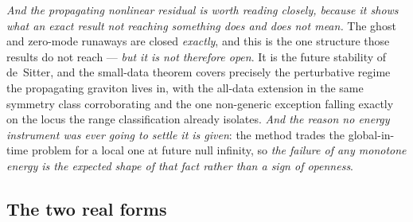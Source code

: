 \documentclass[11pt,a4paper]{article}
\theoremstyle{plain}
\theoremstyle{definition}
\begin{document}
\emph{And the propagating nonlinear residual is worth reading closely, because it shows what an exact result
not reaching something does and does not mean.} The ghost and zero-mode runaways are closed \emph{exactly},
and this is the one structure those results do not reach --- \emph{but it is not therefore open}. It is the
future stability of de~Sitter, and the small-data theorem covers precisely the perturbative regime the
propagating graviton lives in, with the all-data extension in the same symmetry class corroborating and the
one non-generic exception falling exactly on the locus the range classification already isolates. \emph{And
the reason no energy instrument was ever going to settle it is given}: the method trades the global-in-time
problem for a local one at future null infinity, so \emph{the failure of any monotone energy is the expected
shape of that fact rather than a sign of openness}.

\subsection{The two real forms}
\end{document}
